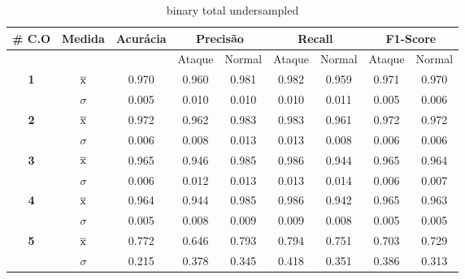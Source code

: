 \begin{table}[htb]
    \centering
    \begin{tabular}{c|c|c|cc|cc|cc}
        \hline
        \# \textbf{C.O} & \textbf{Medida} & \textbf{Acurácia} & \multicolumn{2}{c|}{ \textbf{Precisão} } & \multicolumn{2}{c|}{ \textbf{Recall} } & \multicolumn{2}{c}{ \textbf{F1-Score} } \\
        \hline
        & & & Ataque & Normal & Ataque & Normal & Ataque & Normal \\
        \hline
        \multirow{2}{*}{ \textbf{1} } & $ \overline{\rm x} $ & 0.970 & 0.960 & 0.981 & 0.982 & 0.959 & 0.971 & 0.970 \\
        & $\sigma$ & 0.005 & 0.010 & 0.010 & 0.010 & 0.011 & 0.005 & 0.006 \\
        \hline
        \multirow{2}{*}{ \textbf{2} } & $ \overline{\rm x} $ & 0.972 & 0.962 & 0.983 & 0.983 & 0.961 & 0.972 & 0.972 \\
        & $\sigma$ & 0.006 & 0.008 & 0.013 & 0.013 & 0.008 & 0.006 & 0.006 \\
        \hline
        \multirow{2}{*}{ \textbf{3} } & $ \overline{\rm x} $ & 0.965 & 0.946 & 0.985 & 0.986 & 0.944 & 0.965 & 0.964 \\
        & $\sigma$ & 0.006 & 0.012 & 0.013 & 0.013 & 0.014 & 0.006 & 0.007 \\
        \hline
        \multirow{2}{*}{ \textbf{4} } & $ \overline{\rm x} $ & 0.964 & 0.944 & 0.985 & 0.986 & 0.942 & 0.965 & 0.963 \\
        & $\sigma$ & 0.005 & 0.008 & 0.009 & 0.009 & 0.008 & 0.005 & 0.005 \\
        \hline
        \multirow{2}{*}{ \textbf{5} } & $ \overline{\rm x} $ & 0.772 & 0.646 & 0.793 & 0.794 & 0.751 & 0.703 & 0.729 \\
        & $\sigma$ & 0.215 & 0.378 & 0.345 & 0.418 & 0.351 & 0.386 & 0.313 \\
        \hline
    \end{tabular} 
    \caption{binary total undersampled}
\end{table}